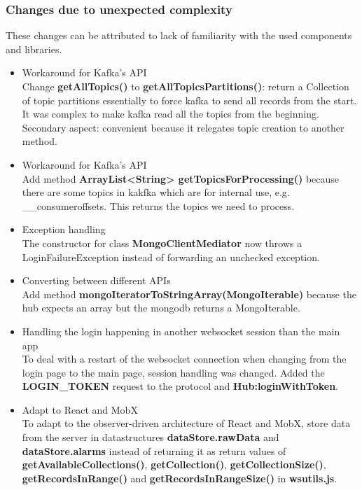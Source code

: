 \documentclass[oneside, english, final]{design}
\begin{document}
\subsubsection{Changes due to unexpected complexity}
These changes can be attributed to lack of familiarity with the used components and libraries.
\begin{itemize}
  \item{Workaround for Kafka's API}
    \\
    Change \textsf{\textbf{getAllTopics()}} to \textsf{\textbf{getAllTopicsPartitions()}}:
    return a Collection of topic partitions essentially to force kafka to send all records from the start.
    It was complex to make kafka read all the topics from the beginning.
    Secondary aspect: convenient because it relegates topic creation to another method.

  \item{Workaround for Kafka's API}
    \\
    Add method \textsf{\textbf{ArrayList<String> getTopicsForProcessing()}}
  because there are some topics in kakfka which are for internal use, e.g. \_\_consumeroffsets.
 This returns the topics we need to process.
	
  \item{Exception handling}
    \\ 
    The constructor for class \textsf{\textbf{MongoClientMediator}} now throws a LoginFailureException instead of forwarding an unchecked exception.

  \item{Converting between different APIs}
    \\ 
    Add method \textsf{\textbf{mongoIteratorToStringArray(MongoIterable)}}
    because the hub expects an array but the mongodb returns a MongoIterable.

  \item{Handling the login happening in another websocket session than the main app}
    \\
    To deal with a restart of the websocket connection when changing from the login page to the main page, session handling was changed. Added the \textsf{\textbf{LOGIN\_TOKEN}} request to the protocol and \textsf{\textbf{Hub:loginWithToken}}.

  \item{Adapt to React and MobX}
    \\
    To adapt to the observer-driven architecture of React and MobX, store data from the server in datastructures \textsf{\textbf{dataStore.rawData}} and \textsf{\textbf{dataStore.alarms}}
    instead of returning it as return values of
    \textsf{\textbf{getAvailableCollections()}},
    \textsf{\textbf{getCollection()}}, \textsf{\textbf{getCollectionSize()}}, \textsf{\textbf{getRecordsInRange()}} and \textsf{\textbf{getRecordsInRangeSize()}} in \textsf{\textbf{wsutils.js}}.

\end{itemize}
\end{document}
